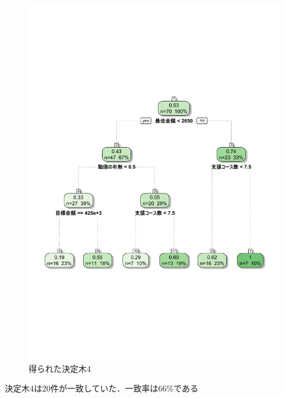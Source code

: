 \begin{figure}[H]
\centering
\includegraphics[width=13cm]{figure26.pdf}
\caption{得られた決定木4}\label{sannp}
\end{figure}

決定木4は20件が一致していた．一致率は66\%である

